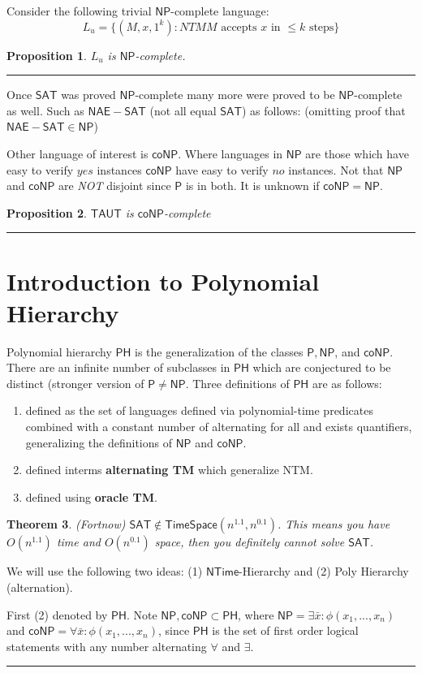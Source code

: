 \documentclass[twoside]{article}
\newcounter{lecnum}
\newtheorem{theorem}{Theorem}[lecnum]
\newtheorem{proposition}[theorem]{Proposition}
\newenvironment{proof}{{\bf Proof:}}{\hfill\rule{2mm}{2mm}}
\def\P{\mathsf{P}}
\def\NP{\mathsf{NP}}
\def\coNP{\mathsf{coNP}}
\def\PH{\mathsf{PH}}
\def\SAT{\mathsf{SAT}}
\def\TAUT{\mathsf{TAUT}}
\def\NTime{\mathsf{NTime}}
\begin{document}
Consider the following trivial $\NP$-complete language:
\[L_u = \{ (M, x, 1^k): NTM M \mbox{ accepts } x \mbox{ in } \leq k \mbox{ steps}\}\]
\begin{proposition}
$L_u$ is $\NP$-complete.
\end{proposition}
\begin{proof}

\end{proof}

Once $\SAT$ was proved $\NP$-complete many more were proved to be $\NP$-complete as well. Such as $\mathsf{NAE-SAT}$ (not all equal $\SAT$) as follows: (omitting proof that $\mathsf{NAE-SAT} \in \NP$) 

Other language of interest is $\coNP$. Where languages in $\NP$ are those which have easy to verify $yes$ instances $\coNP$ have easy to verify $no$ instances. Not that $\NP$ and $\coNP$ are \emph{NOT} disjoint since $\P$ is in both. It is unknown if $\coNP = \NP$. 

\begin{proposition}
$\TAUT$ is $\coNP$-complete
\end{proposition}
\begin{proof}

\end{proof}

\section{Introduction to Polynomial Hierarchy}

Polynomial hierarchy $\PH$ is the generalization of the classes $\P, \NP$, and $\coNP$. There are an infinite number of subclasses in $\PH$ which are conjectured to be distinct (stronger version of $\P \neq \NP$. Three definitions of $\PH$ are as follows:
\begin{enumerate}
\item defined as the set of languages defined via polynomial-time predicates combined with a constant number of alternating for all and exists quantifiers, generalizing the definitions of $\NP$ and $\coNP$. 
\item defined interms \textbf{alternating TM} which generalize NTM.
\item defined using \textbf{oracle TM}.
\end{enumerate}

\begin{theorem}
(Fortnow) $\SAT \notin \mathsf{TimeSpace} (n^{1.1}, n^{0.1})$. This means you have $O(n^{1.1})$ time and $O(n^{0.1})$ space, then you definitely cannot solve $\SAT$.
\end{theorem}
\begin{proof}
We will use the following two ideas: (1) $\NTime$-Hierarchy and (2) Poly Hierarchy (alternation). 

First (2) denoted by $\PH$. Note $\NP, \coNP \subset \PH$, where $\NP = \exists \bar{x}: \phi(x_1, ..., x_n)$ and $\coNP = \forall \bar{x}: \phi (x_1, ..., x_n)$, since $\PH$ is the set of first order logical statements with any number alternating $\forall$ and $\exists$. 
\end{proof} 
\end{document}
